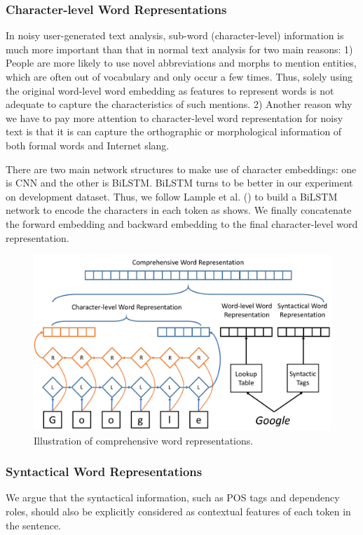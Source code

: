 \subsubsection{Character-level Word Representations}
In noisy user-generated text analysis, sub-word (character-level) information is much more important than that in normal text analysis for two main reasons:
1) People are more likely to use novel abbreviations and morphs to mention entities, which are often out of vocabulary and only occur a few times. 
Thus, solely using the original word-level word embedding as features to represent  words is not adequate to capture the characteristics of such mentions.
2) Another reason why we have to pay more attention to character-level word representation for noisy text is that it is can capture the orthographic or morphological information of both formal words and Internet slang. 

There are two main network structures to make use of character embeddings: 
one is CNN \cite{DBLP:conf/acl/MaH16} and the other is BiLSTM\cite{DBLP:conf/naacl/LampleBSKD16}.
BiLSTM turns to be better in our experiment on development dataset.
Thus, we follow Lample et al. (\citeyear{DBLP:conf/naacl/LampleBSKD16}) to build a BiLSTM network to encode the characters in each token as  shows.
We finally concatenate the forward embedding and backward embedding to the final character-level word representation.
\begin{figure}[th!]
	\includegraphics[width=\columnwidth]{figures/comprehensive}
	\caption{Illustration of comprehensive word representations.}
	\label{fig:comprehensive}
\end{figure}
\subsubsection{Syntactical Word Representations}
We argue that the syntactical information, such as POS tags and dependency roles, should also be explicitly considered as contextual features of each token in the sentence. 


